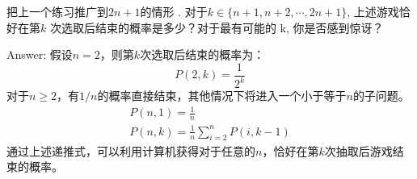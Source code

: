 \exer 把上一个练习推广到$2n + 1$的情形 . 对于$k \in \{n + 1,n + 2,\cdots ,2n + 1\}$, 上述游戏恰好在第$k$ 次选取后结束的概率是多少？对于最有可能的 k, 你是否感到惊讶？\par
Answer: 假设$n=2$，则第$k$次选取后结束的概率为：
\[P(2, k)=\frac{1}{2^k}\]
对于$n\ge 2$，有$1/n$的概率直接结束，其他情况下将进入一个小于等于$n$的子问题。
\begin{gather*}
    P(n, 1)=\frac{1}{n} \\
    P(n, k)=\frac{1}{n}\sum_{i=2}^n P(i, k-1)
\end{gather*}
通过上述递推式，可以利用计算机获得对于任意的$n$，恰好在第$k$次抽取后游戏结束的概率。